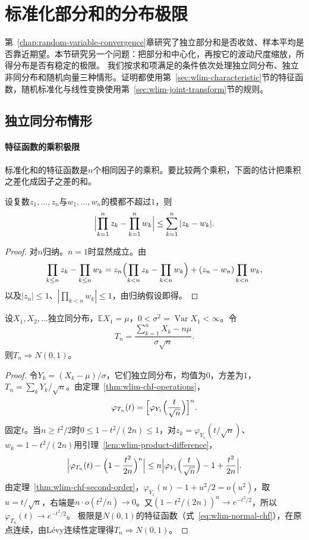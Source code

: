 \section{标准化部分和的分布极限}
\label{sec:wlim-clt}

第~\ref{chap:random-variable-convergence}章研究了独立部分和是否收敛、样本平均是否靠近期望。本节研究另一个问题：把部分和中心化，再按它的波动尺度缩放，所得分布是否有稳定的极限。
我们按求和项满足的条件依次处理独立同分布、独立非同分布和随机向量三种情形。证明都使用第~\ref{sec:wlim-characteristic}节的特征函数，随机标准化与线性变换使用第~\ref{sec:wlim-joint-transform}节的规则。

\subsection{独立同分布情形}

\paragraph{特征函数的乘积极限}
标准化和的特征函数是$n$个相同因子的乘积。要比较两个乘积，下面的估计把乘积之差化成因子之差的和。

\begin{lemma}[乘积之差]
\label{lem:wlim-product-difference}
设复数$z_1,\ldots,z_n$与$w_1,\ldots,w_n$的模都不超过$1$，则
\[
  \Bigl|\prod_{k=1}^nz_k-\prod_{k=1}^nw_k\Bigr|\leq\sum_{k=1}^n|z_k-w_k|.
\]
\end{lemma}

\begin{proof}
对$n$归纳。$n=1$时显然成立。由
\[
  \prod_{k\leq n}z_k-\prod_{k\leq n}w_k=z_n\Bigl(\prod_{k<n}z_k-\prod_{k<n}w_k\Bigr)+(z_n-w_n)\prod_{k<n}w_k,
\]
以及$|z_n|\leq1$、$|\prod_{k<n}w_k|\leq1$，由归纳假设即得。
\end{proof}

\begin{theorem}
\label{thm:wlim-clt-iid}
设$X_1,X_2,\ldots$独立同分布，$\mathbb E X_1=\mu$，$0<\sigma^2=\operatorname{Var}X_1<\infty$。令
\[
  T_n=\frac{\sum_{k=1}^nX_k-n\mu}{\sigma\sqrt n}.
\]
则$T_n\Rightarrow N(0,1)$。
\end{theorem}

\begin{proof}
令$Y_k=(X_k-\mu)/\sigma$，它们独立同分布，均值为$0$，方差为$1$，$T_n=\sum_kY_k/\sqrt n$。由定理~\ref{thm:wlim-chf-operations}，
\[
  \varphi_{T_n}(t)=\Bigl[\varphi_{Y_1}\Bigl(\frac t{\sqrt n}\Bigr)\Bigr]^n.
\]
固定$t$。当$n\geq t^2/2$时$0\leq1-t^2/(2n)\leq1$，对$z_k=\varphi_{Y_1}(t/\sqrt n)$、$w_k=1-t^2/(2n)$用引理~\ref{lem:wlim-product-difference}，
\[
  \Bigl|\varphi_{T_n}(t)-\Bigl(1-\frac{t^2}{2n}\Bigr)^n\Bigr|\leq n\Bigl|\varphi_{Y_1}\Bigl(\frac t{\sqrt n}\Bigr)-1+\frac{t^2}{2n}\Bigr|.
\]
由定理~\ref{thm:wlim-chf-second-order}，$\varphi_{Y_1}(u)-1+u^2/2=o(u^2)$，取$u=t/\sqrt n$，右端是$n\cdot o(t^2/n)\to0$。又$(1-t^2/(2n))^n\to e^{-t^2/2}$，所以$\varphi_{T_n}(t)\to e^{-t^2/2}$。
极限是$N(0,1)$的特征函数（式~\eqref{eq:wlim-normal-chf}），在原点连续，由L\'evy连续性定理得$T_n\Rightarrow N(0,1)$。
\end{proof}

